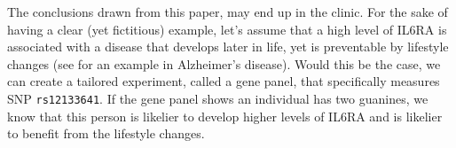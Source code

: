 The conclusions drawn from this paper,
may end up in the clinic.
For the sake of having a clear (yet fictitious) example,
let's assume that a high level of IL6RA 
is associated with a disease that develops later in life,
yet is preventable by lifestyle 
changes (see \cite{pope2003will} for an example in Alzheimer's disease).
Would this be the case, we can create a tailored 
experiment, called a gene panel, that specifically measures
SNP \verb|rs12133641|. 
If the gene panel shows an individual has two guanines, 
we know that this person is likelier to develop higher levels of
IL6RA and is likelier to benefit from the lifestyle changes.

